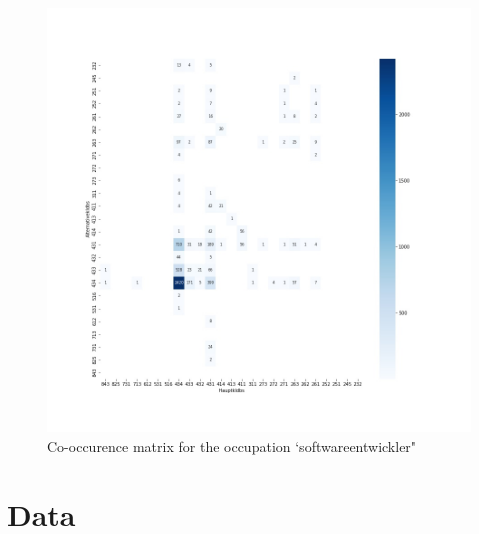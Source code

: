 \documentclass[12pt, a4paper, titlepage]{article}
\begin{document}
\begin{figure}[hb!]
  \center
  \includegraphics[scale=0.5]{co_occurence_softwareentwickler.jpg}
  \caption{\label{fig: F28} Co-occurence matrix for the occupation `softwareentwickler"}
\end{figure}



\clearpage





\newpage
\appendix
\section{Data}
\end{document}
